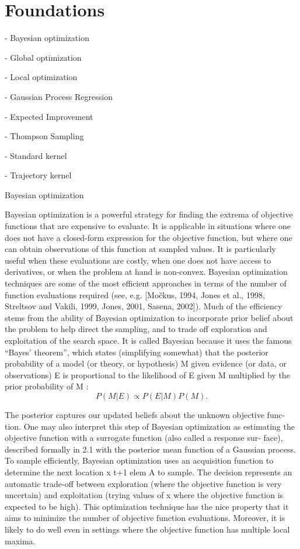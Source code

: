 \chapter{Foundations}
\label{chap:2}
%

- Bayesian optimization

- Global optimization

- Local optimization

- Gaussian Process Regression

- Expected Improvement

- Thompson Sampling

- Standard kernel

- Trajectory kernel

Bayesian optimization



Bayesian optimization is a powerful strategy for finding the extrema of objective
functions that are expensive to evaluate. It is applicable in situations where one
does not have a closed-form expression for the objective function, but where one
can obtain observations of this function at sampled values. It
is particularly useful when these evaluations are costly, when one does not have
access to derivatives, or when the problem at hand is non-convex.
Bayesian optimization techniques are some of the most efficient approaches
in terms of the number of function evaluations required (see, e.g. [Močkus, 1994,
Jones et al., 1998, Streltsov and Vakili, 1999, Jones, 2001, Sasena, 2002]). Much
of the efficiency stems from the ability of Bayesian optimization to incorporate
prior belief about the problem to help direct the sampling, and to trade off
exploration and exploitation of the search space. It is called Bayesian because
it uses the famous “Bayes’ theorem”, which states (simplifying somewhat) that
the posterior probability of a model (or theory, or hypothesis) M given evidence (or data, or observations) E is proportional to the likelihood of E given
M multiplied by the prior probability of M :
$$P(M|E)\propto P(E|M)P(M).$$



The posterior captures our updated beliefs about the unknown objective func-
tion. One may also interpret this step of Bayesian optimization as estimating
the objective function with a surrogate function (also called a response sur-
face), described formally in 2.1 with the posterior mean function of a Gaussian
process.
To sample efficiently, Bayesian optimization uses an acquisition function to
determine the next location x t+1 elem A to sample. The decision represents an
automatic trade-off between exploration (where the objective function is very
uncertain) and exploitation (trying values of x where the objective function is
expected to be high). This optimization technique has the nice property that it
aims to minimize the number of objective function evaluations. Moreover, it is
likely to do well even in settings where the objective function has multiple local
maxima.


